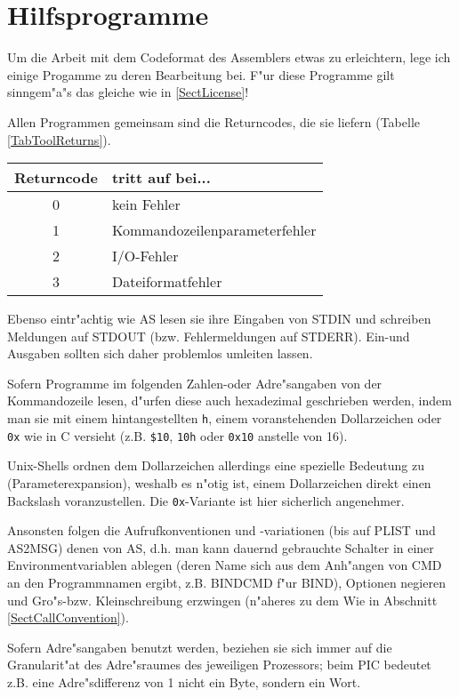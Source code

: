 \documentclass[12pt,a4paper,twoside]{report}
\newcommand{\tty}[1]{{\tt #1}}
\begin{document}
{%

\cleardoublepage
\chapter{Hilfsprogramme}
\label{ChapTools}

Um die Arbeit mit dem Codeformat des Assemblers etwas zu erleichtern,
lege ich einige Progamme zu deren Bearbeitung bei.  F"ur diese Programme
gilt sinngem"a"s das gleiche wie in \ref{SectLicense}!
 
Allen Programmen gemeinsam sind die Returncodes, die sie liefern (Tabelle
\ref{TabToolReturns}).
\par
\begin{table*}[ht]
\begin{center}\begin{tabular}{|c|l|}
\hline
Returncode &  tritt auf bei... \\
\hline
\hline
0          &  kein Fehler \\
1          &  Kommandozeilenparameterfehler \\
2          &  I/O-Fehler \\
3          &  Dateiformatfehler \\
\hline
\end{tabular}\end{center}
\caption{Returncodes der Dienstprogramme\label{TabToolReturns}}
\end{table*}
Ebenso eintr"achtig wie AS lesen sie ihre Eingaben von STDIN und schreiben
Meldungen auf STDOUT (bzw. Fehlermeldungen auf STDERR).  Ein-und
Ausgaben sollten sich daher problemlos umleiten lassen.
\par
Sofern Programme im folgenden Zahlen-oder Adre"sangaben von der
Kommandozeile lesen, d"urfen diese auch hexadezimal geschrieben werden,
indem man sie mit einem hintangestellten \tty{h}, einem voranstehenden
Dollarzeichen oder \tty{0x} wie in C versieht (z.B. \verb!$10!,
\verb!10h! oder \verb!0x10! anstelle von 16).
\par
Unix-Shells  ordnen dem Dollarzeichen allerdings
eine spezielle Bedeutung zu (Parameterexpansion), weshalb es n"otig ist,
einem Dollarzeichen direkt einen Backslash voranzustellen.  Die
\tty{0x}-Variante ist hier sicherlich angenehmer.
\par
Ansonsten folgen die Aufrufkonventionen und -variationen (bis auf PLIST
und AS2MSG) denen von AS, d.h. man kann dauernd gebrauchte Schalter in
einer Environmentvariablen ablegen (deren Name sich aus dem Anh"angen von
CMD an den Programmnamen ergibt, z.B. BINDCMD f"ur BIND), Optionen
negieren und Gro"s-bzw. Kleinschreibung erzwingen (n"aheres zu dem Wie in
Abschnitt \ref{SectCallConvention}).
\par
Sofern Adre"sangaben benutzt werden, beziehen sie sich immer auf die
Granularit"at des Adre"sraumes des jeweiligen Prozessors; beim PIC bedeutet
z.B. eine Adre"sdifferenz von 1 nicht ein Byte, sondern ein Wort.

}
\end{document}
